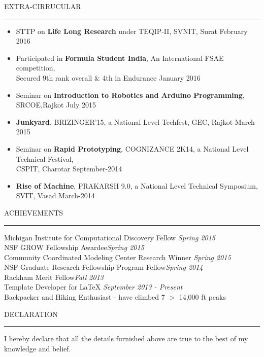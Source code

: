 \documentclass{resume} %
\renewenvironment{rSection}[1]{
\sectionskip
\textcolor{TsinghuaPurple}{\MakeUppercase{#1}}
\sectionlineskip
\hrule
\begin{list}{}{
\setlength{\leftmargin}{0em}
}
\item[]
}{
\end{list}
}
\begin{document}
\begin{rSection}{Extra-Cirrucular} \itemsep -2pt   

\begin{itemize}
 
\item STTP on \textbf{Life Long Research} under TEQIP-II, SVNIT, Surat \hfill February 2016 
\item Participated in \textbf{Formula Student India}, An International FSAE competition,  
\\Secured 9th rank overall \& 4th in Endurance \hfill January 2016  
\item Seminar on \textbf{Introduction to Robotics and Arduino Programming}, SRCOE,Rajkot \hfill July 2015 
\item \textbf{Junkyard}, BRIZINGER'15, a National Level Techfest,  GEC, Rajkot \hfill March-2015
\item Seminar on \textbf{Rapid Prototyping}, COGNIZANCE 2K14, a National Level Technical Festival, \\CSPIT, Charotar  \hfill September-2014   
\item \textbf{Rise of Machine}, PRAKARSH 9.0, a National Level Technical Symposium, SVIT, Vasad \hfill March-2014  
  
\end{itemize}  


\end{rSection} 




\begin{rSection}{Achievements} \itemsep -2pt
{Michigan Institute for Computational Discovery Fellow }\hfill {\em Spring 2015} \\
{NSF GROW Fellowship Awardee}\hfill {\em Spring 2015} \\
{Community Coordinated Modeling Center Research Winner} \hfill {\em Spring 2015} \\
{NSF Graduate Research Fellowship Program Fellow}\hfill {\em Spring 2014}\\
{Rackham Merit Fellow}\hfill {\em Fall 2013}\\
{Template Developer for LaTeX} \hfill {\em September 2013 - Present} \\
{Backpacker and Hiking Enthusiast - have climbed 7 $>$ 14,000 ft peaks}
\end{rSection}



\begin{rSection}{ Declaration  } \itemsep -3pt        

\item I hereby declare that all the details furnished above are true to the best of my knowledge and belief.   
  
\end{rSection}
\end{document}
